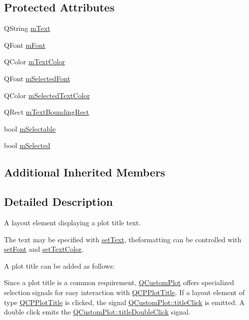 \subsection*{Protected Attributes}
\begin{DoxyCompactItemize}
\item 
Q\+String \hyperlink{class_q_c_p_plot_title_a0d961bfac1211d59d3b0bc30d35f6379}{m\+Text}
\item 
Q\+Font \hyperlink{class_q_c_p_plot_title_ad9e2c2a2e941f3444cb692a51df0df62}{m\+Font}
\item 
Q\+Color \hyperlink{class_q_c_p_plot_title_a5d7f834d6522c1a72fb0682c0b7ebe13}{m\+Text\+Color}
\item 
Q\+Font \hyperlink{class_q_c_p_plot_title_a95003186c39bbab902873a8ef4cbb547}{m\+Selected\+Font}
\item 
Q\+Color \hyperlink{class_q_c_p_plot_title_a8b9760e62af92814c4effdd7ad69c5f9}{m\+Selected\+Text\+Color}
\item 
Q\+Rect \hyperlink{class_q_c_p_plot_title_a7178a0f6c1e633c144c17b4de4e0b840}{m\+Text\+Bounding\+Rect}
\item 
bool \hyperlink{class_q_c_p_plot_title_aadefb5e2b19b1cc7deda0a55ec747884}{m\+Selectable}
\item 
bool \hyperlink{class_q_c_p_plot_title_afef1342a20f5ca985a20b9cfdc03d815}{m\+Selected}
\end{DoxyCompactItemize}
\subsection*{Additional Inherited Members}


\subsection{Detailed Description}
A layout element displaying a plot title text. 

The text may be specified with \hyperlink{class_q_c_p_plot_title_aae5a93e88050dfb2cbf6adc087516821}{set\+Text}, theformatting can be controlled with \hyperlink{class_q_c_p_plot_title_a199fc7170802ea65006c371875349e37}{set\+Font} and \hyperlink{class_q_c_p_plot_title_a71273e3a0ca6b4c151591b37b9e5ce33}{set\+Text\+Color}.

A plot title can be added as follows\+: 
\begin{DoxyCodeInclude}
\end{DoxyCodeInclude}
 Since a plot title is a common requirement, \hyperlink{class_q_custom_plot}{Q\+Custom\+Plot} offers specialized selection signals for easy interaction with \hyperlink{class_q_c_p_plot_title}{Q\+C\+P\+Plot\+Title}. If a layout element of type \hyperlink{class_q_c_p_plot_title}{Q\+C\+P\+Plot\+Title} is clicked, the signal \hyperlink{class_q_custom_plot_a2137a819e518fee7edd1c0bf5984d8d6}{Q\+Custom\+Plot\+::title\+Click} is emitted. A double click emits the \hyperlink{class_q_custom_plot_ad51d65f6abf5edfaeef6e0519a4c1a2f}{Q\+Custom\+Plot\+::title\+Double\+Click} signal. 

